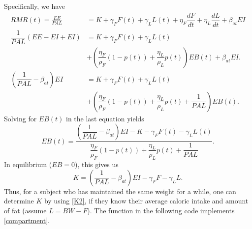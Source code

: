 Specifically, we have
\begin{align*}
RMR(t) = \frac{EE}{PAL}&= K + \gamma_F F(t) + \gamma_L L(t) + \eta_F \dfrac{dF}{dt} + \eta_L \dfrac{dL}{dt}  + \beta_{at} EI\\
\dfrac{1}{PAL}\left(EE - EI + EI \right) &= K + \gamma_F F(t) + \gamma_L L(t) \\
&+ \left(\dfrac{\eta_F}{\rho_F} (1-p(t)) + \dfrac{\eta_L}{\rho_L} p(t) \right) EB(t) + \beta_{at} EI.\\
\left(\dfrac{1}{PAL}-\beta_{at}\right) EI &= K + \gamma_F F(t) + \gamma_L L(t) \\
&+ \left(\dfrac{\eta_F}{\rho_F} (1-p(t)) + \dfrac{\eta_L}{\rho_L} p(t) + \dfrac{1}{PAL}\right) EB(t).
\end{align*}
Solving for $EB(t)$ in the last equation yields
\begin{equation}
\label{EB2}
EB(t) = \dfrac{\left( \dfrac{1}{PAL} - \beta_{at} \right) EI - K - \gamma_F F(t) - \gamma_L L(t)}{\dfrac{\eta_F}{\rho_F} (1-p(t)) + \dfrac{\eta_L}{\rho_L} p(t) + \dfrac{1}{PAL}}.
\end{equation}
In equilibrium ($EB = 0$), this gives us
\begin{equation}
\label{K2}
K = \left(\dfrac{1}{PAL}-\beta_{at}\right) EI - \gamma_F F - \gamma_L L.
\end{equation}
Thus, for a subject who has maintained the same weight for a while, one can determine $K$ by using \eqref{K2}, if they know their average caloric intake and amount of fat (assume $L=BW-F$). The function  in the following code implements \eqref{compartment}.


